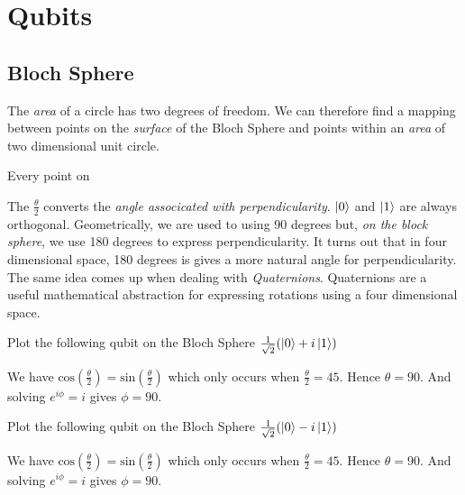 
\chapter{Qubits}



\section{Bloch Sphere}



The \textit{area} of a circle has two degrees of freedom. 
We can therefore find a mapping between points on the \textit{surface} of the Bloch Sphere and points 
within an \textit{area} of two dimensional unit circle. 

Every point on 





The $\frac{\theta}{2}$ converts the \textit{angle associcated with perpendicularity}. 
$\left|0\right\rangle$ and $\left|1\right\rangle$ are always orthogonal. Geometrically, we are used to using 90 degrees
but, \textit{on the block sphere}, we use 180 degrees to express perpendicularity. 
It turns out that in four dimensional space, 180 degrees is gives a more natural 
angle for perpendicularity. The same idea comes up when dealing with \textit{Quaternions}. 
Quaternions are a useful mathematical abstraction for expressing rotations 
using a four dimensional space.


\begin{example}
Plot the following qubit on the Bloch Sphere $\frac{1}{\sqrt{2}}(\left|0\right\rangle + i\left|1\right\rangle)$

We have  $\text{cos}(\frac{\theta}{2}) = \text{sin}(\frac{\theta}{2})$
which only occurs when $\frac{\theta}{2} = 45$. Hence $\theta = 90$.
And solving  $e^{i\phi} = i$ gives $\phi = 90$.
\end{example}

\begin{example}
Plot the following qubit on the Bloch Sphere $\frac{1}{\sqrt{2}}(\left|0\right\rangle - i\left|1\right\rangle)$

We have  $\text{cos}(\frac{\theta}{2}) = \text{sin}(\frac{\theta}{2})$
which only occurs when $\frac{\theta}{2} = 45$. Hence $\theta = 90$.
And solving  $e^{i\phi} = i$ gives $\phi = 90$.
\end{example}


